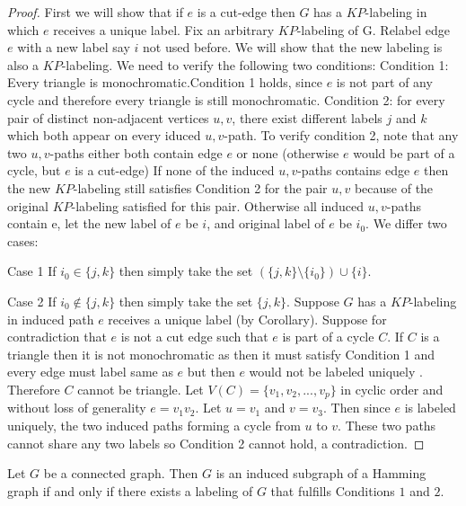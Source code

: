 \documentclass[12pt,a4paper,titlepage,openany]{report}
\begin{document}
\begin{proof}
First we will show that if $e$ is a cut-edge then $G$ has a $KP$-labeling in which $e$ receives a unique label. Fix an arbitrary $KP$-labeling of G.\newline
Relabel edge $e$ with a new label say $i$ not used before. We will show that the new labeling is also a $KP$-labeling. We need to verify the following two conditions:\newline
Condition 1: Every triangle is monochromatic.\newline Condition 1 holds, since $e$ is not part of any cycle and therefore every triangle is still monochromatic.\newline
Condition 2: for every pair of distinct non-adjacent vertices $u,v$, there exist different labels $j$ and $k$ which both appear on every iduced $u,v$-path.\newline
To verify condition 2, note that any two $u,v$-paths either both contain edge $e$ or none (otherwise $e$ would be part of a cycle, but $e$ is a cut-edge)\newline
If none of the induced $u,v$-paths contains edge $e$ then the new $KP$-labeling still satisfies Condition 2 for the pair $u,v$ because of the original $KP$-labeling satisfied for this pair.\newline
Otherwise all induced $u,v$-paths contain e, let the new label of $e$ be $i$, and original label of $e$ be $i_0$. We differ two cases:
\item[Case 1] If $i_0\in \{j,k\}$ then simply take the set $(\{j,k\}\setminus \{i_0\})\cup \{i\}$.
\item[Case 2] If $i_0\not\in \{j,k\}$ then simply take the set $\{j,k\}$.\newline
Suppose $G$ has a $KP$-labeling in induced path $e$ receives a unique label (by Corollary). Suppose for contradiction that $e$ is not a cut edge such that $e$ is part of a cycle $C$. If $C$ is a triangle then it is not monochromatic as then it must satisfy Condition 1 and every edge must label same as $e$ but then $e$ would not be labeled uniquely . Therefore $C$ cannot be triangle. 
Let $V(C)=\{v_1,v_2,...,v_p\}$ in cyclic order and without loss of generality $e=v_1v_2$. Let $u=v_1$ and $v=v_3$. Then since $e$ is labeled uniquely, the two induced paths forming a cycle from $u$ to $v$. These two paths cannot share any two labels so Condition 2 cannot hold, a contradiction. 
\end{proof}
\begin{theorem}\label{thm:mainkp}
Let $G$ be a connected graph. Then $G$ is an induced subgraph of a Hamming graph if and only if there exists a labeling of $G$ that fulfills Conditions $1$ and $2$.
\end{theorem}
\end{document}
